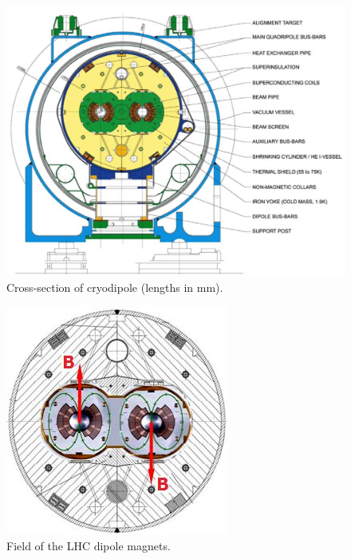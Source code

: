 		\begin{figure}[!ht]
		\centering
		\includegraphics[width=\textwidth,keepaspectratio=true]{chapters/chapter3_experiment/images/dipole-crosssection.png}
		\caption{Cross-section of cryodipole (lengths in mm). \cite{lhc-machine}}
		\label{fig:dipole-xsec}
		\end{figure}

		\begin{figure}[!ht]
		\centering
		\includegraphics[width=.45\textwidth,keepaspectratio=true]{chapters/chapter3_experiment/images/dipole-field.jpeg}
		\caption{Field of the LHC dipole magnets. \cite{dipole-field}}
		\label{fig:dipole-field}
		\end{figure}

